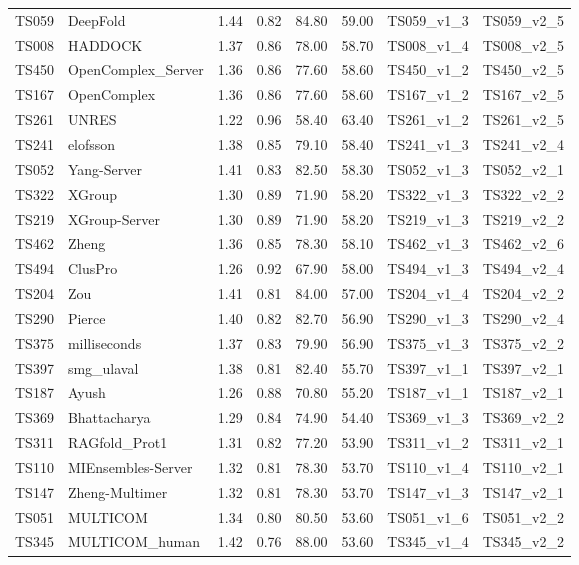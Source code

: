 \begin{longtable}{llllllll}
TS059 & DeepFold & 1.44 & 0.82 & 84.80 & 59.00 & TS059\_v1\_3 & TS059\_v2\_5 \\ 
TS008 & HADDOCK & 1.37 & 0.86 & 78.00 & 58.70 & TS008\_v1\_4 & TS008\_v2\_5 \\ 
TS450 & OpenComplex\_Server & 1.36 & 0.86 & 77.60 & 58.60 & TS450\_v1\_2 & TS450\_v2\_5 \\ 
TS167 & OpenComplex & 1.36 & 0.86 & 77.60 & 58.60 & TS167\_v1\_2 & TS167\_v2\_5 \\ 
TS261 & UNRES & 1.22 & 0.96 & 58.40 & 63.40 & TS261\_v1\_2 & TS261\_v2\_5 \\ 
TS241 & elofsson & 1.38 & 0.85 & 79.10 & 58.40 & TS241\_v1\_3 & TS241\_v2\_4 \\ 
TS052 & Yang-Server & 1.41 & 0.83 & 82.50 & 58.30 & TS052\_v1\_3 & TS052\_v2\_1 \\ 
TS322 & XGroup & 1.30 & 0.89 & 71.90 & 58.20 & TS322\_v1\_3 & TS322\_v2\_2 \\ 
TS219 & XGroup-Server & 1.30 & 0.89 & 71.90 & 58.20 & TS219\_v1\_3 & TS219\_v2\_2 \\ 
TS462 & Zheng & 1.36 & 0.85 & 78.30 & 58.10 & TS462\_v1\_3 & TS462\_v2\_6 \\ 
TS494 & ClusPro & 1.26 & 0.92 & 67.90 & 58.00 & TS494\_v1\_3 & TS494\_v2\_4 \\ 
TS204 & Zou & 1.41 & 0.81 & 84.00 & 57.00 & TS204\_v1\_4 & TS204\_v2\_2 \\ 
TS290 & Pierce & 1.40 & 0.82 & 82.70 & 56.90 & TS290\_v1\_3 & TS290\_v2\_4 \\ 
TS375 & milliseconds & 1.37 & 0.83 & 79.90 & 56.90 & TS375\_v1\_3 & TS375\_v2\_2 \\ 
TS397 & smg\_ulaval & 1.38 & 0.81 & 82.40 & 55.70 & TS397\_v1\_1 & TS397\_v2\_1 \\ 
TS187 & Ayush & 1.26 & 0.88 & 70.80 & 55.20 & TS187\_v1\_1 & TS187\_v2\_1 \\ 
TS369 & Bhattacharya & 1.29 & 0.84 & 74.90 & 54.40 & TS369\_v1\_3 & TS369\_v2\_2 \\ 
TS311 & RAGfold\_Prot1 & 1.31 & 0.82 & 77.20 & 53.90 & TS311\_v1\_2 & TS311\_v2\_1 \\ 
TS110 & MIEnsembles-Server & 1.32 & 0.81 & 78.30 & 53.70 & TS110\_v1\_4 & TS110\_v2\_1 \\ 
TS147 & Zheng-Multimer & 1.32 & 0.81 & 78.30 & 53.70 & TS147\_v1\_3 & TS147\_v2\_1 \\ 
TS051 & MULTICOM & 1.34 & 0.80 & 80.50 & 53.60 & TS051\_v1\_6 & TS051\_v2\_2 \\ 
TS345 & MULTICOM\_human & 1.42 & 0.76 & 88.00 & 53.60 & TS345\_v1\_4 & TS345\_v2\_2 \\ 

\end{longtable}
